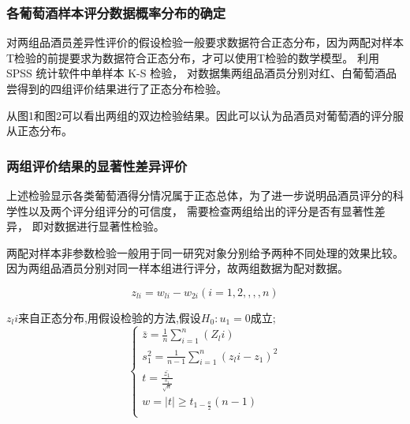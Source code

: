 \documentclass[UTF8]{ctexart}
\begin{document}
\subsubsection{各葡萄酒样本评分数据概率分布的确定}
对两组品酒员差异性评价的假设检验一般要求数据符合正态分布，因为两配对样本T检验的前提要求为数据符合正态分布，才可以使用T检验的数学模型。
利用 SPSS 统计软件中单样本 K-S 检验\cite{young1977proof}， 对数据集两组品酒员分别对红、白葡萄酒品尝得到的四组评价结果进行了正态分布检验。



从图1\label{figure 1}和图2\label{figure 2}可以看出两组的双边检验结果。因此可以认为品酒员对葡萄酒的评分服从正态分布。

\subsubsection{两组评价结果的显著性差异评价}
上述检验显示各类葡萄酒得分情况属于正态总体，为了进一步说明品酒员评分的科学性以及两个评分组评分的可信度， 需要检查两组给出的评分是否有显著性差异， 即对数据进行显著性检验。

两配对样本非参数检验一般用于同一研究对象分别给予两种不同处理的效果比较。因为两组品酒员分别对同一样本组进行评分，故两组数据为配对数据。

\begin{equation}
	z_{li} = w_{li}-w_{2i}(i=1,2,,,,n)
\end{equation}

$z_li$来自正态分布,用假设检验的方法,假设$H_{0}:u_1=0$成立;
\[\left\{\begin{array}{llcl}

		\bar{z}=\frac{1}{n}\sum_{i=1}^n(Z_li)         \\

		s_{1}^2=\frac{1}{n-1}\sum_{i=1}^n(z_li-z_1)^2 \\

		t=\frac{\bar{z_1}}{\frac{s_1}{\sqrt{n}}}      \\

		w={\mid t \mid \ge t_{1-\frac{a}{2}}(n-1)}    \\

	\end{array} \right.\]
\end{document}
